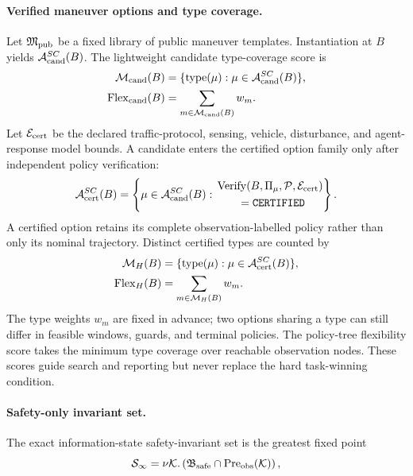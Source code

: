\documentclass[letterpaper]{article} %
\begin{document}
\paragraph{Verified maneuver options and type coverage.}
Let $\mathfrak M_{\rm pub}$ be a fixed library of public maneuver templates. Instantiation at $B$ yields $\mathcal A_{\rm cand}^{SC}(B)$. The lightweight candidate type-coverage score is
\begin{equation}
\begin{aligned}
\mathcal M_{\rm cand}(B)&=
\{\operatorname{type}(\mu):
\mu\in\mathcal A_{\rm cand}^{SC}(B)\},\\
\operatorname{Flex}_{\rm cand}(B)&=
\sum_{m\in\mathcal M_{\rm cand}(B)}w_m.
\end{aligned}
\label{eq:flex-candidate}
\end{equation}
Let $\mathcal E_{\rm cert}$ be the declared traffic-protocol, sensing, vehicle, disturbance, and agent-response model bounds. A candidate enters the certified option family only after independent policy verification:
\begin{equation}
\mathcal A_{\rm cert}^{SC}(B)=
\left\{\mu\in\mathcal A_{\rm cand}^{SC}(B):
\begin{aligned}
&\operatorname{Verify}(B,\Pi_\mu,\mathcal P,\mathcal E_{\rm cert})\\
&\qquad=\texttt{CERTIFIED}
\end{aligned}\right\}.
\label{eq:sco-set}
\end{equation}
A certified option retains its complete observation-labelled policy rather than only its nominal trajectory. Distinct certified types are counted by
\begin{equation}
\begin{aligned}
\mathcal M_H(B)&=\{\operatorname{type}(\mu):\mu\in\mathcal A_{\rm cert}^{SC}(B)\},\\
\operatorname{Flex}_H(B)&=\sum_{m\in\mathcal M_H(B)}w_m.
\end{aligned}
\label{eq:flex}
\end{equation}
The type weights $w_m$ are fixed in advance; two options sharing a type can still differ in feasible windows, guards, and terminal policies. The policy-tree flexibility score takes the minimum type coverage over reachable observation nodes. These scores guide search and reporting but never replace the hard task-winning condition.

\paragraph{Safety-only invariant set.}
The exact information-state safety-invariant set is the greatest fixed point
\begin{equation}
\mathcal S_\infty=\nu\mathcal K.\left(\mathfrak B_{\rm safe}\cap\operatorname{Pre}_{\rm obs}(\mathcal K)\right),
\label{eq:safe-invariant}
\end{equation}
\end{document}
